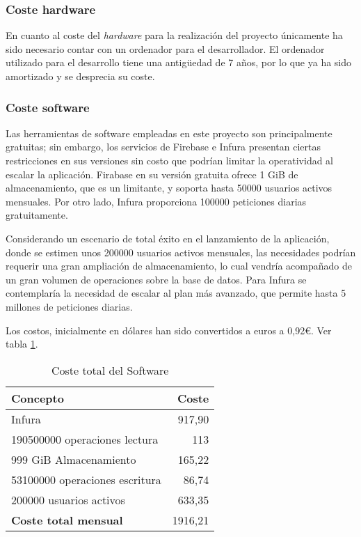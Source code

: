 \subsubsection{Coste hardware}

En cuanto al coste del \textit{hardware} para la realización del proyecto únicamente ha sido necesario contar con un ordenador para el desarrollador.
El ordenador utilizado para el desarrollo tiene una antigüedad de 7 años, por lo que ya ha sido amortizado y se desprecia su coste.

\subsubsection{Coste software}

Las herramientas de software empleadas en este proyecto son principalmente gratuitas; sin embargo, los servicios de Firebase e Infura presentan ciertas restricciones en sus versiones sin costo que podrían limitar la operatividad al escalar la aplicación.
Firabase en su versión gratuita ofrece 1 GiB de almacenamiento, que es un limitante, y soporta hasta 50000 usuarios activos mensuales.
Por otro lado, Infura proporciona 100000 peticiones diarias gratuitamente.

Considerando un escenario de total éxito en el lanzamiento de la aplicación, donde se estimen unos 200000 usuarios activos mensuales, las necesidades podrían requerir una gran ampliación de almacenamiento, lo cual vendría acompañado de un gran volumen de operaciones sobre la base de datos.
Para Infura se contemplaría la necesidad de escalar al plan más avanzado, que permite hasta 5 millones de peticiones diarias.

Los costos, inicialmente en dólares han sido convertidos a euros a 0,92€. Ver tabla \ref{tab:costeSoftware}.

\begin{table}[p]
	\centering
	\begin{tabular}{l r}
		\toprule
		\textbf{Concepto} &  \textbf{Coste} \\
		\midrule
		    Infura & 917,90 \\
    190500000 operaciones lectura & 113 \\
    999 GiB Almacenamiento & 165,22 \\
    53100000 operaciones escritura & 86,74 \\
    200000 usuarios activos & 633,35 \\
		\midrule
		\textbf{Coste total mensual} & 1916,21 \\
		\bottomrule
	\end{tabular}
	\caption{Coste total del Software}
	\label{tab:costeSoftware}
\end{table}


